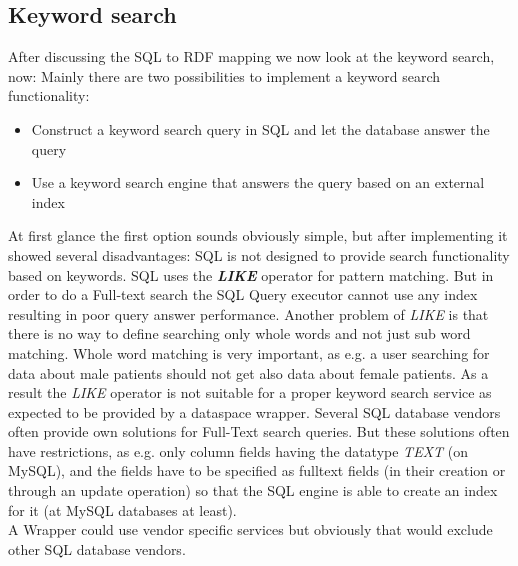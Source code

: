 \subsection{Keyword search}

After discussing the SQL to RDF mapping we now look at the keyword search, now:
Mainly there are two possibilities to implement a keyword search functionality:
\begin{itemize}
	\item {Construct a keyword search query in SQL and let the database answer the query}
	
	\item {Use a keyword search engine that answers the query based on an external index}
\end{itemize}

At first glance the first option sounds obviously simple, but after implementing it showed several disadvantages: SQL is not designed to provide search functionality based on keywords. SQL uses the \textbf{\emph{LIKE}} operator for pattern matching. But in order to do a Full-text search the SQL Query executor cannot use any index resulting in poor query answer performance. Another problem of \emph{LIKE} is that there is no way to define searching only whole words and not just sub word matching. Whole word matching is very important, as e.g. a user searching for data about male patients should not get also data about female patients.
As a result the \emph{LIKE} operator is not suitable for a proper keyword search service as expected to be provided by a dataspace wrapper. Several SQL database vendors often provide own solutions for Full-Text search queries. But these solutions often have restrictions, as e.g. only column fields having the datatype \emph{TEXT} (on MySQL), and the fields have to be specified as fulltext fields (in their creation or through an update operation) so that the SQL engine is able to create an index for it (at MySQL databases at least).\\
A Wrapper could use vendor specific services but obviously that would exclude other SQL database vendors.

